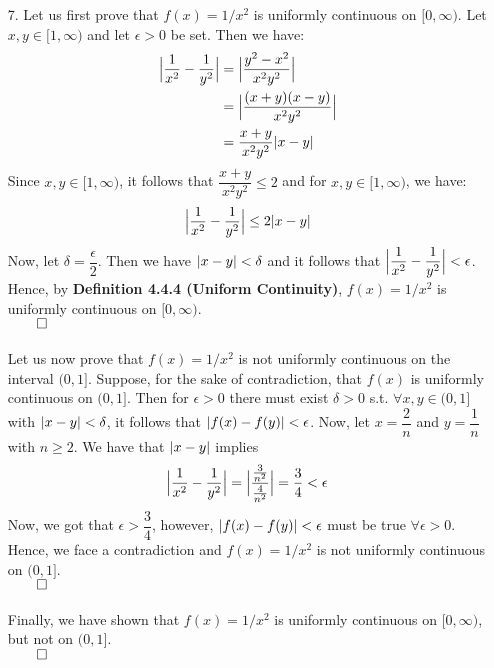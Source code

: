 \documentclass[11pt]{article}
\DeclarePairedDelimiter\abs{\lvert}{\rvert}%
\DeclarePairedDelimiter\absb{\Big\lvert}{\Big\rvert}%
\begin{document}
\begin{itemize}
    \item[7.]
        Let us first prove that $f(x) = 1/x^2$ is uniformly continuous on
        $[0, \infty)$. Let $x, y \in [1, \infty)$ and let $\epsilon > 0$ be
        set. Then we have:
        \begin{align*}
            \absb{\dfrac{1}{x^2} - \dfrac{1}{y^2}} &= \absb{\dfrac{y^2 - x^2}{x^2y^2}}\\
                                                   &= \absb{\dfrac{(x + y)(x - y)}{x^2y^2}}\\
                                                   &= \dfrac{x + y}{x^2y^2}\abs{x - y}
        \end{align*}
        Since $x, y \in [1, \infty)$, it follows that
        $\dfrac{x + y}{x^2y^2} \leq 2$ and for $x, y \in [1, \infty)$, we have:
        \begin{equation*}
            \absb{\dfrac{1}{x^2} - \dfrac{1}{y^2}} \leq 2\abs{x - y}
        \end{equation*}
        Now, let $\delta = \dfrac{\epsilon}{2}$. Then we have
        $\abs{x - y} < \delta$ and it follows that
        $\absb{\dfrac{1}{x^2} - \dfrac{1}{y^2}} < \epsilon$. Hence, by
        \textbf{Definition 4.4.4 (Uniform Continuity)}, $f(x) = 1/x^2$ is
        uniformly continuous on $[0, \infty)$.\\
        $\qed$
        \\
        \\
        Let us now prove that $f(x) = 1/x^2$ is not uniformly continuous on the
        interval $(0, 1]$. Suppose, for the sake of contradiction, that $f(x)$
        is uniformly continuous on $(0, 1]$. Then for $\epsilon > 0$ there must
        exist $\delta  > 0$ s.t. $\forall x, y \in (0, 1]$ with
        $\abs{x - y} < \delta$, it follows that $\abs{f(x) - f(y)} < \epsilon$.
        Now, let $x = \dfrac{2}{n}$ and $y = \dfrac{1}{n}$ with $n \geq 2$. We
        have that $\abs{x - y}$ implies
        \begin{equation*}
            \absb{\dfrac{1}{x^2} - \dfrac{1}{y^2}} = \absb{\dfrac{\frac{3}{n^2}}{\frac{4}{n^2}}} = \dfrac{3}{4} < \epsilon
        \end{equation*}
        Now, we got that $\epsilon > \dfrac{3}{4}$, however, $\abs{f(x) - f(y)}
        < \epsilon$ must be true $\forall \epsilon > 0$. Hence, we face a contradiction
        and $f(x) = 1/x^2$ is not uniformly continuous on $(0, 1]$.\\
        $\qed$
        \\
        \\
        Finally, we have shown that $f(x) = 1/x^2$ is uniformly continuous on
        $[0, \infty)$, but not on $(0, 1]$.\\
        $\qed$


\end{itemize}
\end{document}
